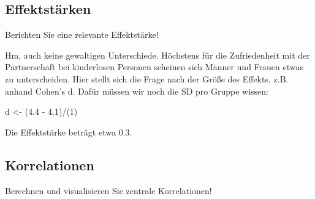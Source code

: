 \documentclass[12pt,ngerman,]{book}
\makeatletter
\newenvironment{Shaded}{\begin{snugshade}}{\end{snugshade}}
\newcommand{\KeywordTok}[1]{\textcolor[rgb]{0.13,0.29,0.53}{\textbf{{#1}}}}
\newcommand{\DataTypeTok}[1]{\textcolor[rgb]{0.13,0.29,0.53}{{#1}}}
\newcommand{\DecValTok}[1]{\textcolor[rgb]{0.00,0.00,0.81}{{#1}}}
\newcommand{\FloatTok}[1]{\textcolor[rgb]{0.00,0.00,0.81}{{#1}}}
\newcommand{\StringTok}[1]{\textcolor[rgb]{0.31,0.60,0.02}{{#1}}}
\newcommand{\CommentTok}[1]{\textcolor[rgb]{0.56,0.35,0.01}{\textit{{#1}}}}
\newcommand{\NormalTok}[1]{{#1}}
\newenvironment{kframe}{%
\medskip{}
\setlength{\fboxsep}{.8em}
 \def\at@end@of@kframe{}%
 \ifinner\ifhmode%
  \def\at@end@of@kframe{\end{minipage}}%
  \begin{minipage}{\columnwidth}%
 \fi\fi%
 \def\FrameCommand##1{\hskip\@totalleftmargin \hskip-\fboxsep
 \colorbox{shadecolor}{##1}\hskip-\fboxsep
     \hskip-\linewidth \hskip-\@totalleftmargin \hskip\columnwidth}%
 \MakeFramed {\advance\hsize-\width
   \@totalleftmargin\z@ \linewidth\hsize
   \@setminipage}}%
 {\par\unskip\endMakeFramed%
 \at@end@of@kframe}
\renewenvironment{Shaded}{\begin{kframe}}{\end{kframe}}
\theoremstyle{definition}
\theoremstyle{definition}
\theoremstyle{remark}
\makeatother
\begin{document}
\subsection{Effektstärken}\label{effektstarken}

Berichten Sie eine relevante Effektstärke!

Hm, auch keine gewaltigen Unterschiede. Höchstens für die Zufriedenheit
mit der Partnerschaft bei kinderlosen Personen scheinen sich Männer und
Frauen etwas zu unterscheiden. Hier stellt sich die Frage nach der Größe
des Effekts, z.B. anhand Cohen's d. Dafür müssen wir noch die SD pro
Gruppe wissen:

\begin{Shaded}
\end{Shaded}

\begin{Shaded}
\begin{Highlighting}[]
\NormalTok{d <-}\StringTok{ }\NormalTok{(}\FloatTok{4.4} \NormalTok{-}\StringTok{ }\FloatTok{4.1}\NormalTok{)/(}\DecValTok{1}\NormalTok{)}
\end{Highlighting}
\end{Shaded}

Die Effektstärke beträgt etwa 0.3.

\subsection{Korrelationen}\label{korrelationen}

Berechnen und visualisieren Sie zentrale Korrelationen!
\end{document}
